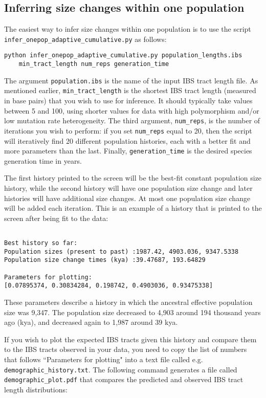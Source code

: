 \documentclass[12pt]{article}
\begin{document}
\subsection{Inferring size changes within one population}
The easiest way to infer size changes within one population is to use the script \verb|infer_onepop_adaptive_cumulative.py| as follows:

\begin{Verbatim}
python infer_onepop_adaptive_cumulative.py population_lengths.ibs 
	min_tract_length num_reps generation_time
\end{Verbatim}

The argument \verb|population.ibs| is the name of the input IBS tract length file. As mentioned earlier, \verb|min_tract_length| is the shortest IBS tract length (measured in base pairs) that you wish to use for inference. It should typically take values between 5 and 100, using shorter values for data with high polymorphism and/or low mutation rate heterogeneity. The third argument, \verb|num_reps|, is the number of iterations you wish to perform: if you set \verb|num_reps| equal to 20, then the script will iteratively find 20 different population histories, each with a better fit and more parameters than the last.  Finally, \verb|generation_time| is the desired species generation time in years.

The first history printed to the screen will be the best-fit constant population size history, while the second history will have one population size change and later histories will have additional size changes. At most one population size change will be added each iteration. This is an example of a history that is printed to the screen after being fit to the data:

\begin{Verbatim}

Best history so far: 
Population sizes (present to past) :1987.42, 4903.036, 9347.5338
Population size change times (kya) :39.47687, 193.64829

Parameters for plotting: 
[0.07895374, 0.30834284, 0.198742, 0.4903036, 0.93475338]

\end{Verbatim}

These parameters describe a history in which the ancestral effective population size was 9,347. The population size decreased to 4,903 around 194 thousand years ago (kya), and decreased again to 1,987 around 39 kya. 

If you wish to plot the expected IBS tracts given this history and compare them to the IBS tracts observed in your data, you need to copy the list of numbers that follows ``Parameters for plotting" into a text file called e.g. \verb|demographic_history.txt|. The following command generates a file called \verb|demographic_plot.pdf| that compares the predicted and observed IBS tract length distributions:
\end{document}
